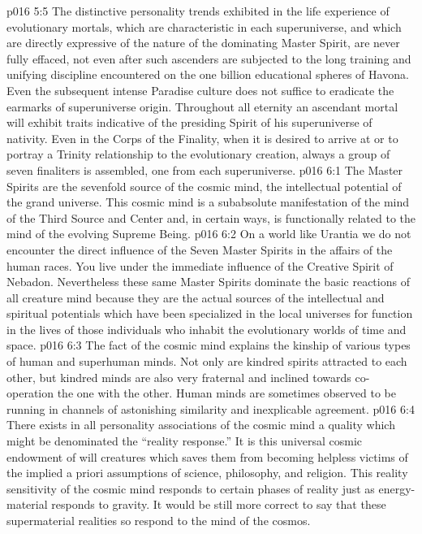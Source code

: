\vs p016 5:5 The distinctive personality trends exhibited in the life experience of evolutionary mortals, which are characteristic in each superuniverse, and which are directly expressive of the nature of the dominating Master Spirit, are never fully effaced, not even after such ascenders are subjected to the long training and unifying discipline encountered on the one billion educational spheres of Havona. Even the subsequent intense Paradise culture does not suffice to eradicate the earmarks of superuniverse origin. Throughout all eternity an ascendant mortal will exhibit traits indicative of the presiding Spirit of his superuniverse of nativity. Even in the Corps of the Finality, when it is desired to arrive at or to portray a  Trinity relationship to the evolutionary creation, always a group of seven finaliters is assembled, one from each superuniverse.
\vs p016 6:1 The Master Spirits are the sevenfold source of the cosmic mind, the intellectual potential of the grand universe. This cosmic mind is a subabsolute manifestation of the mind of the Third Source and Center and, in certain ways, is functionally related to the mind of the evolving Supreme Being.
\vs p016 6:2 On a world like Urantia we do not encounter the direct influence of the Seven Master Spirits in the affairs of the human races. You live under the immediate influence of the Creative Spirit of Nebadon. Nevertheless these same Master Spirits dominate the basic reactions of all creature mind because they are the actual sources of the intellectual and spiritual potentials which have been specialized in the local universes for function in the lives of those individuals who inhabit the evolutionary worlds of time and space.
\vs p016 6:3 The fact of the cosmic mind explains the kinship of various types of human and superhuman minds. Not only are kindred spirits attracted to each other, but kindred minds are also very fraternal and inclined towards co\hyp{}operation the one with the other. Human minds are sometimes observed to be running in channels of astonishing similarity and inexplicable agreement.
\vs p016 6:4 \pc There exists in all personality associations of the cosmic mind a quality which might be denominated the “reality response.” It is this universal cosmic endowment of will creatures which saves them from becoming helpless victims of the implied a priori assumptions of science, philosophy, and religion. This reality sensitivity of the cosmic mind responds to certain phases of reality just as energy\hyp{}material responds to gravity. It would be still more correct to say that these supermaterial realities so respond to the mind of the cosmos.
